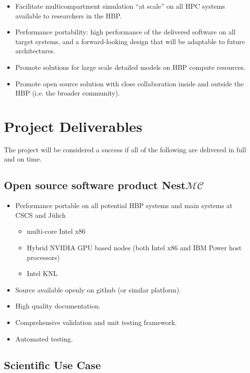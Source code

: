 \documentclass[11pt,a4paper]{article}
\newcommand{\julich}[0]{J\"ulich\xspace}
\newcommand{\nestmc}[0]{Nest$\mathcal{MC}$\xspace}
\begin{document}
\begin{itemize}
    \item Facilitate multicompartment simulation ``at scale'' on all HPC systems available to researchers in the HBP.
    \item Performance portability: high performance of the delivered software on all target systems, and a forward-looking design that will be adaptable to future architectures.
    \item Promote solutions for large scale detailed models on HBP compute resources.
    \item Promote open source solution with close collaboration inside and outside the HBP (i.e. the broader community).
\end{itemize}

\section{Project Deliverables}
The project will be considered a success if all of the following are delivered in full and on time.

\subsection{Open source software product \nestmc}

\begin{itemize}
    \item   Performance portable on all potential HBP systems and main systems at CSCS and \julich
    \begin{itemize}
        \item   multi-core Intel x86
        \item   Hybrid NVIDIA GPU based nodes (both Intel x86 and IBM Power host processors)
        \item   Intel KNL
    \end{itemize}
    \item   Source available openly on github (or similar platform).
    \item   High quality documentation.
    \item   Comprehensive validation and unit testing framework.
    \item   Automated testing.
\end{itemize}

\subsection{Scientific Use Case}
\end{document}
